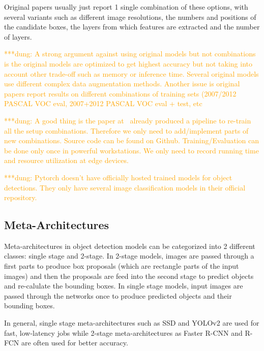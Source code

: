 \documentclass[conference]{IEEEtran}
\newcommand{\alnote}[1]{ {\textcolor{blue} { ***andre: #1 }}}
\newcommand{\dungnote}[1]{ {\textcolor{orange} { ***dung: #1 }}}
\newcommand{\alnote}[1]{}
\newcommand{\dungnote}[1]{}
\begin{document}
Original papers usually just report 1 single combination of these options, with several variants such as different image resolutions, the numbers and positions of the candidate boxes, the layers from which features are extracted and the number of layers.

\dungnote{A strong argument against using original models but not combinations is the original models are optimized to get highest accuracy but not taking into account other trade-off such as memory or inference time. Several original models use different complex data augmentation methods. Another issue is original papers report results on different combinations of training sets (2007/2012 PASCAL VOC eval, 2007+2012 PASCAL VOC eval + test, etc}

\dungnote{A good thing is the paper at~\cite{huang2017speed} already produced a pipeline to re-train all the setup combinations. Therefore we only need to add/implement parts of new combinations. Source code can be found on Github. Training/Evaluation can be done only once in powerful workstations. We only need to record running time and resource utilization at edge devices.}

\dungnote{Pytorch doesn't have officially hosted trained models for object detections. They only have several image classification models in their official repository.}

\subsection{Meta-Architectures}


Meta-architectures in object detection models can be categorized into 2 different classes: single stage and 2-stage. In 2-stage models, images are passed through a first parts to produce box proposals (which are rectangle parts of the input images) and then the proposals are feed into the second stage to predict objects and re-calulate the bounding boxes. In single stage models, input images are passed through the networks once to produce predicted objects and their bounding boxes.

In general, single stage meta-architectures such as SSD and YOLOv2 are used for fast, low-latency jobs while 2-stage meta-architectures as Faster R-CNN and R-FCN are often used for better accuracy.
\end{document}
